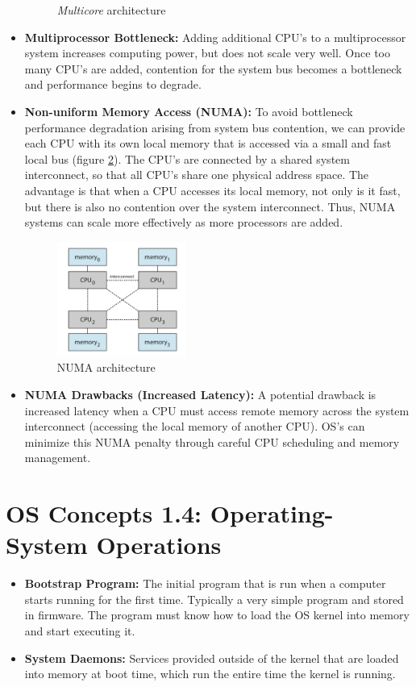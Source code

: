 \documentclass[12pt]{article}
\begin{document}
\begin{itemize}
\begin{figure}[ht]
            \caption{\textit{Multicore} architecture}
            \label{fig:multicore-architecture}
        \end{figure}
    \item \textbf{Multiprocessor Bottleneck:} Adding additional CPU's to a multiprocessor system increases computing power, but does not scale very well. Once too many CPU's are added, contention for the system bus becomes a bottleneck and performance begins to degrade.
    \item \textbf{Non-uniform Memory Access (NUMA):} To avoid bottleneck performance degradation arising from system bus contention, we can provide each CPU with its own local memory that is accessed via a small and fast local bus (figure \ref{fig:numa-architecture}). The CPU's are connected by a shared system interconnect, so that all CPU's share one physical address space. The advantage is that when a CPU accesses its local memory, not only is it fast, but there is also no contention over the system interconnect. Thus, NUMA systems can scale more effectively as more processors are added.
        \begin{figure}[ht]
            \centering
            \includegraphics[width=0.4\textwidth]{figures/numa-architecture.jpg}
            \caption{NUMA architecture}
            \label{fig:numa-architecture}
        \end{figure}
    \item \textbf{NUMA Drawbacks (Increased Latency):} A potential drawback is increased latency when a CPU must access remote memory across the system interconnect (accessing the local memory of another CPU). OS's can minimize this NUMA penalty through careful CPU scheduling and memory management.
\end{itemize}

\section*{OS Concepts 1.4: Operating-System Operations}

\begin{itemize}
    \item \textbf{Bootstrap Program:} The initial program that is run when a computer starts running for the first time. Typically a very simple program and stored in firmware. The program must know how to load the OS kernel into memory and start executing it.
    \item \textbf{System Daemons:} Services provided outside of the kernel that are loaded into memory at boot time, which run the entire time the kernel is running.
\end{itemize}
\end{document}
